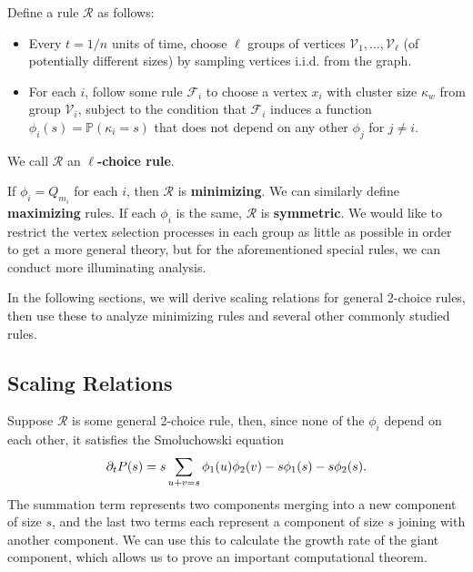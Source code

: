 \documentclass[twoside,10pt]{article}
\begin{document}
\begin{defn}[]
        Define a rule $\mathcal{R}$ as follows:
        \begin{itemize}
                \item Every $t=1/n$ units of time, choose $\ell$ groups of vertices $\mathcal{V}_1, \dots, \mathcal{V}_{\ell}$ (of potentially different sizes) by sampling vertices i.i.d. from the graph.
                \item For each $i$, follow some rule $\mathcal{F}_{i}$ to choose a vertex $x_i$ with cluster size $\kappa_w$ from group $\mathcal{V}_i$, subject to the condition that $\mathcal{F}_i$ induces a function $\phi_i(s) = \mathbb{P}\left( \kappa_i=s \right) $ that does not depend on any other $\phi_j$ for $j \neq i$.
        \end{itemize}
We call $\mathcal{R}$ an \textbf{$\ell$-choice rule}.
\end{defn}

If $\phi_{i}=Q_{m_i}$ for each $i$, then $\mathcal{R}$ is \textbf{minimizing}. We can similarly define \textbf{maximizing} rules. If each $\phi_i$ is the same, $\mathcal{R}$ is \textbf{symmetric}. We would like to restrict the vertex selection processes in each group as little as possible in order to get a more general theory, but for the aforementioned special rules, we can conduct more illuminating analysis.

In the following sections, we will derive scaling relations for general 2-choice rules, then use these to analyze minimizing rules and several other commonly studied rules. 

\subsection{Scaling Relations}

Suppose $\mathcal{R}$ is some general 2-choice rule, then, since none of the $\phi_i$ depend on each other, it satisfies the Smoluchowski equation
        \[
                \partial_{t}{P(s)} = s \sum_{u+v=s} \phi_1(u) \phi_2(v) - s \phi_1(s) - s\phi_2(s).
        \]
The summation term represents two components merging into a new component of size $s$, and the last two terms each represent a component of size $s$ joining with another component. We can use this to calculate the growth rate of the giant component, which allows us to prove an important computational theorem.
\end{document}
